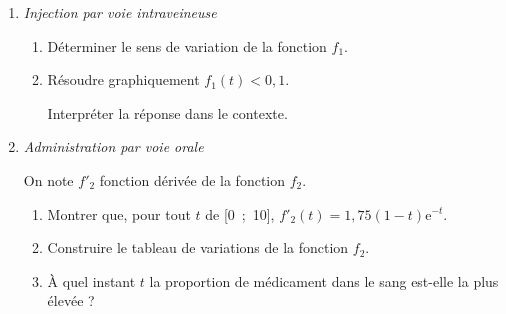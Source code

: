 \documentclass[10pt]{article}
\providecommand{\e}{{\mathrm{e}}}
\begin{document}
\begin{enumerate}
\item \emph{Injection par voie intraveineuse}
	\begin{enumerate}
		\item Déterminer le sens de variation de la fonction $f_1$.
		\item Résoudre graphiquement $f_1(t) < 0,1$. 
		
Interpréter la réponse dans le contexte.
	\end{enumerate}
\item \emph{Administration par voie orale}

On note $f'_2$ fonction dérivée de la fonction $f_2$.

\medskip

	\begin{enumerate}
		\item Montrer que, pour tout $t$ de [0~;~10], $f'_2(t) = 1,75(1- t)\e^{-t}$.
		\item Construire le tableau de variations de la fonction $f_2$.
		\item À quel instant $t$ la proportion de médicament dans le sang est-elle la plus élevée ?
	\end{enumerate}
\end{enumerate}

\medskip
\end{document}
